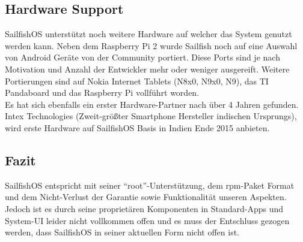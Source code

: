 \subsection{Hardware Support}
\mbox{SailfishOS} unterstützt noch weitere Hardware auf welcher das System genutzt werden kann. Neben dem Raspberry Pi 2\cite{online:sailfish-rpi2} wurde Sailfish noch auf eine Auswahl von Android Geräte von der Community\cite{online:sailfish-android-port} portiert. Diese Ports sind je nach Motivation und Anzahl der Entwickler mehr oder weniger ausgereift\cite{online:sailfish-porters}. Weitere Portierungen sind auf Nokia Internet Tablets (N8x0, N9x0, N9), das TI Pandaboard und das Raspberry Pi vollführt worden.\\
Es hat sich ebenfalls ein erster Hardware-Partner nach über 4 Jahren gefunden. Intex Technologies (Zweit-größter Smartphone Hersteller indischen Ursprungs), wird erste Hardware auf \mbox{SailfishOS} Basis in Indien Ende 2015 anbieten\cite{online:jolla-intex-pdf}.\\

\subsection{Fazit}
\mbox{SailfishOS} entspricht mit seiner ``root''-Unterstützung, dem rpm-Paket Format und dem Nicht-Verlust der Garantie sowie Funktionalität unseren Aspekten. Jedoch ist es durch seine proprietären Komponenten in Standard-Apps und System-UI leider nicht vollkommen offen und es muss der Entschluss gezogen werden, dass SailfishOS in seiner aktuellen Form nicht offen ist.